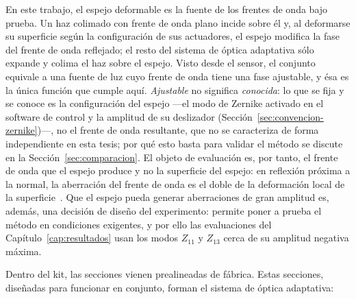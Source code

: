 \documentclass[letterpaper,12pt,oneside]{book}
\begin{document}
En este trabajo, el espejo deformable es la fuente de los frentes de onda bajo prueba. Un
haz colimado con frente de onda plano incide sobre él y, al deformarse su superficie según
la configuración de sus actuadores, el espejo modifica la fase del frente de onda
reflejado; el resto del sistema de óptica adaptativa sólo expande y colima el haz sobre el
espejo. Visto desde el sensor, el conjunto equivale a una fuente de luz cuyo frente de
onda tiene una fase ajustable, y ésa es la única función que cumple aquí. \emph{Ajustable}
no significa \emph{conocida}: lo que se fija y se conoce es la configuración del espejo
—el modo de Zernike activado en el software de control y la amplitud de su deslizador
(Sección~\ref{sec:convencion-zernike})—, no el frente de onda resultante, que no se
caracteriza de forma independiente en esta tesis; por qué esto basta para validar el
método se discute en la Sección~\ref{sec:comparacion}. El objeto de evaluación es, por
tanto, el frente de onda que el espejo produce y no la superficie del espejo: en reflexión
próxima a la normal, la aberración del frente de onda es el doble de la deformación local
de la superficie~\cite{BribiescasTesis}. Que el espejo pueda generar aberraciones de gran
amplitud es, además, una decisión de diseño del experimento: permite poner a prueba el
método en condiciones exigentes, y por ello las evaluaciones del
Capítulo~\ref{cap:resultados} usan los modos $Z_{11}$ y $Z_{13}$ cerca de su amplitud
negativa máxima.

Dentro del kit, las secciones vienen prealineadas de fábrica. Estas secciones, diseñadas
para funcionar en conjunto, forman el sistema de óptica adaptativa:
\end{document}
